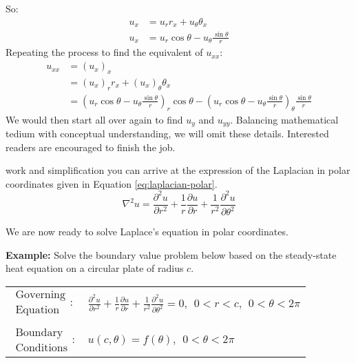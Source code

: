 So:
\begin{align*}
u_x &= u_r r_x + u_{\theta} \theta_x \\
u_x &= u_r \cos{\theta} - u_{\theta}\frac{\sin{\theta}}{r}
\end{align*}
Repeating the process to find the equivalent of $u_{xx}$:
\begin{align*}
u_{xx} &= \left(u_{x}\right)_{x} \\
&= \left(u_x\right)_r r_x + \left(u_x\right)_{\theta} \theta_x \\
&= \left(u_r \cos{\theta} - u_{\theta}\frac{\sin{\theta}}{r} \right)_r \cos{\theta} - \left( u_r \cos{\theta} - u_{\theta}\frac{\sin{\theta}}{r}\right)_{\theta}\frac{\sin{\theta}}{r}
\end{align*}
We would then start all over again to find $u_y$ and $u_{yy}$.  Balancing mathematical tedium with conceptual understanding, we will omit these details.  Interested readers are encouraged to finish the job.

 work and simplification you can arrive at the expression of the Laplacian in polar coordinates given in Equation \ref{eq:laplacian-polar}.
\begin{equation}
\nabla^2u = \frac{\partial^2 u}{\partial r^2} + \frac{1}{r}\frac{\partial u}{\partial r} + \frac{1}{r^2}\frac{\partial^2 u}{\partial \theta^2}
\label{eq:laplacian-polar}
\end{equation}

\vspace{0.1cm}

\noindent We are now ready to solve Laplace's equation in polar coordinates.

\vspace{0.25cm}

\noindent\textbf{Example:} Solve the boundary value problem below based on the steady-state heat equation on a circular plate of radius $c$.

\begin{table}[h]
\begin{tabular}{l l}
$\substack{\text{Governing} \\\text{Equation}}: $& $\frac{\partial^2 u}{\partial r^2} + \frac{1}{r}\frac{\partial u}{\partial r} + \frac{1}{r^2}\frac{\partial^2 u}{\partial \theta^2}= 0, \ \ 0<r<c, \ \ 0<\theta<2 \pi $\\
& \\
$\substack{\text{Boundary} \\ \text{Conditions}}: $ & $u(c,\theta) = f(\theta), \ \ 0 < \theta< 2 \pi$\\
\end{tabular}
\end{table} 

